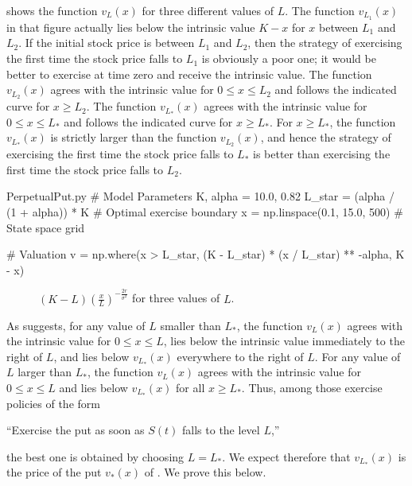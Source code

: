  shows the function $v_L(x)$ for three different values of $L$. The function $v_{L_1}(x)$ in that figure actually lies below the intrinsic value $K - x$ for $x$ between $L_1$ and $L_2$. If the initial stock price is between $L_1$ and $L_2$, then the strategy of exercising the first time the stock price falls to $L_1$ is obviously a poor one; it would be better to exercise at time zero and receive the intrinsic value. The function $v_{L_2}(x)$ agrees with the intrinsic value for $0 \le x \le L_2$ and follows the indicated curve for $x \ge L_2$. The function $v_{L_*}(x)$ agrees with the intrinsic value for $0 \le x \le L_*$ and follows the indicated curve for $x \ge L_*$. For $x \ge L_*$, the function $v_{L_*}(x)$ is strictly larger than the function $v_{L_2}(x)$, and hence the strategy of exercising the first time the stock price falls to $L_*$ is better than exercising the first time the stock price falls to $L_2$.


\begin{Pcode}{PerpetualPut.py}
	# Model Parameters
	K, alpha = 10.0, 0.82
	L_star = (alpha / (1 + alpha)) * K  # Optimal exercise boundary
	x = np.linspace(0.1, 15.0, 500)     # State space grid

	# Valuation
	v = np.where(x > L_star,
	(K - L_star) * (x / L_star) ** -alpha,
	K - x)
\end{Pcode}

\begin{figure}[H]
	\centering
	
	\caption{\((K-L)(\frac{x}{L})^{-\frac{2r}{\sigma^2}}\) for three values of \(L\). }
	\label{fig:ExerciseBoundaryValue}
\end{figure}

As  suggests, for any value of $L$ smaller than $L_*$, the function $v_L(x)$ agrees with the intrinsic value for $0 \le x \le L$, lies below the intrinsic value immediately to the right of $L$, and lies below $v_{L_{*}}(x)$ everywhere to the right of $L$. For any value of $L$ larger than $L_*$, the function $v_L(x)$ agrees with the intrinsic value for $0 \le x \le L$ and lies below $v_{L_{*}}(x)$ for all $x \ge L_*$. Thus, among those exercise policies of the form
\begin{center}
	``Exercise the put as soon as $S(t)$ falls to the level $L$,''
\end{center}
the best one is obtained by choosing $L = L_*$. We expect therefore that $v_{L_{*}}(x)$ is the price of the put $v_*(x)$ of . We prove this below.

